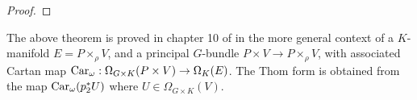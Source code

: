\begin{proof}

\end{proof}

The above theorem is proved in chapter 10 of \cite{guillemin} in the more
general context of a $K$-manifold $E=P\times_\rho V$, and a principal
$G$-bundle  $P\times V \to P\times_\rho V$, with associated Cartan map
$\operatorname{Car}_\omega : \Omega_{G\times K}(P\times V)\to\Omega_K(E)$. The Thom form is
obtained from the map $\operatorname{Car}_{\omega}(p_2^*U)$ where $U\in\Omega_{G\times K}(V)$.


